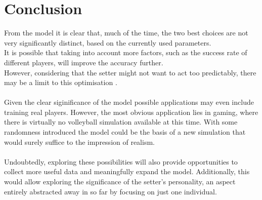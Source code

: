 \documentclass[main.tex]{subfiles}
\begin{document}
  \section{Conclusion}
    
    From the model it is clear that, much of the time, the two best choices are not very significantly distinct, based on the currently used parameters. \\
    It is possible that taking into account more factors, such as the success rate of different players, will improve the accuracy further. \\
    However, considering that the setter might not want to act too predictably, there may be a limit to this optimisation  \cite[chapter 3.1]{gameTheory}.
    \\\\
    Given the clear siginificance of the model possible applications may even include training real players. However, the most obvious application lies in gaming, where there is virtually no volleyball simulation available at this time. With some randomness introduced the model could be the basis of a new simulation that would surely suffice to the impression of realism.
    \\\\
    Undoubtedly, exploring these possibilities will also provide opportunities to collect more useful data and meaningfully expand the model. Additionally, this would allow exploring the significance of the setter's personality, an aspect entirely abstracted away in so far by focusing on just one individual.
    
\end{document}
